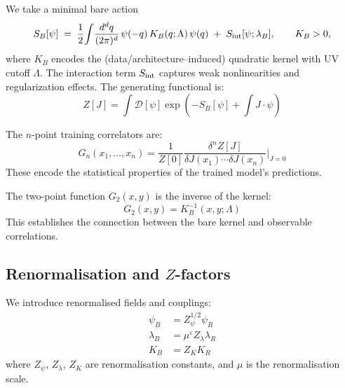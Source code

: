 We take a minimal bare action
\begin{equation}
  S_B[\psi] \;=\;
  \frac{1}{2}\!\int\!\frac{d^d q}{(2\pi)^d}\, \psi(-q)\,K_B(q;\Lambda)\,\psi(q)
  \;+\; S_{\rm int}[\psi;\lambda_B],
  \qquad K_B>0,
  \label{eq:bare_action}
\end{equation}
where $K_B$ encodes the (data/architecture–induced) quadratic kernel with UV
cutoff $\Lambda$. The interaction term $S_{\rm int}$ captures weak nonlinearities
and regularization effects. The generating functional is:
\begin{equation}
  Z[J] = \int \mathcal{D}[\psi] \exp\left(-S_B[\psi] + \int J \cdot \psi\right)
  \label{eq:generating_functional}
\end{equation}

\begin{definition}
\label{def:training-correlators}
The $n$-point training correlators are:
\begin{equation}
  G_n(x_1,\ldots,x_n) = \frac{1}{Z[0]} \frac{\delta^n Z[J]}{\delta J(x_1) \cdots \delta J(x_n)} \bigg|_{J=0}
  \label{eq:n_point_correlator}
\end{equation}
These encode the statistical properties of the trained model's predictions.
\end{definition}

\begin{proposition}
\label{prop:two_point_kernel}
The two-point function $G_2(x,y)$ is the inverse of the kernel:
\begin{equation}
  G_2(x,y) = K_B^{-1}(x,y;\Lambda)
  \label{eq:two_point_inverse}
\end{equation}
This establishes the connection between the bare kernel and observable correlations.
\end{proposition}

\subsection{Renormalisation and $Z$-factors}

\begin{definition}
\label{def:bare_renormalised_fields}
We introduce renormalised fields and couplings:
\begin{align}
  \psi_B &= Z_\psi^{1/2} \psi_R \\
  \lambda_B &= \mu^\varepsilon Z_\lambda \lambda_R \\
  K_B &= Z_K K_R
\end{align}
where $Z_\psi$, $Z_\lambda$, $Z_K$ are renormalisation constants, and $\mu$ is the renormalisation scale.
\end{definition}

